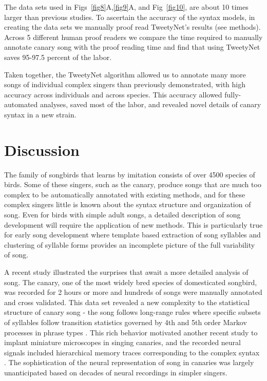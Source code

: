 \documentclass[10pt,letterpaper]{article}
\begin{document}
The data sets used in Figs~\ref{fig8}A,\ref{fig9}A, and Fig~\ref{fig10}, are about 10 times larger than previous studies. To ascertain the accuracy of the syntax models, in creating the data sets we manually proof read TweetyNet's results (see methods). Across 5 different human proof readers we compare the time required to manually annotate canary song with the proof reading time and find that using TweetyNet saves 95-97.5 percent of the labor.
\newline

Taken together, the TweetyNet algorithm allowed us to annotate many more songs of individual complex singers than previously demonstrated, with high accuracy across individuals and across species. This accuracy allowed fully-automated analyses, saved most of the labor, and revealed novel details of canary syntax in a new strain.    

\section*{Discussion}
\label{Discussion}
The family of songbirds that learns by imitation consists of over 4500 species of birds. Some of these singers, such as the canary, produce songs that are much too complex to be automatically annotated with existing methods, and for these complex singers little is known about the syntax structure and organization of song. Even for birds with simple adult songs, a detailed description of song development will require the application of new methods. This is particularly true for early song development where template based extraction of song syllables and clustering of syllable forms provides an incomplete picture of the full variability of song. 

A recent study illustrated the surprises that await a more detailed analysis of song. The canary, one of the most widely bred species of domesticated songbird, was recorded for 2 hours or more and hundreds of songs were manually annotated and cross validated. This data set revealed a new complexity to the statistical structure of canary song - the song follows long-range rules where specific subsets of syllables follow transition statistics governed by 4th and 5th order Markov processes in phrase types \cite{markowitz_long-range_2013}. This rich behavior motivated another recent study to implant miniature microscopes in singing canaries, and the recorded neural signals included hierarchical memory traces corresponding to the complex syntax \cite{cohen_hidden_2020}. The sophistication of the neural representation of song in canaries was largely unanticipated based on decades of neural recordings in simpler singers.
\end{document}
